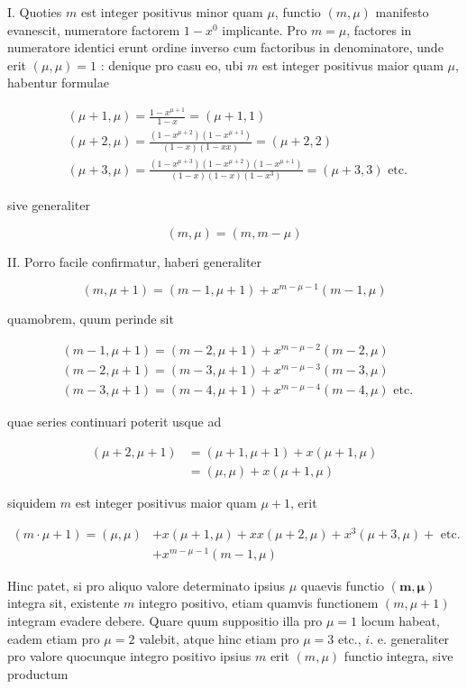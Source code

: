 \documentclass[10pt]{article}
\begin{document}
I. Quoties \(m\) est integer positivus minor quam \(\mu\), functio \((m, \mu)\) manifesto evanescit, numeratore factorem \(1-x^{0}\) implicante. Pro \(m=\mu\), factores in numeratore identici erunt ordine inverso cum factoribus in denominatore, unde erit \((\mu, \mu)=1\) : denique pro casu eo, ubi \(m\) est integer positivus maior quam \(\mu\), habentur formulae

\[
\begin{aligned}
& (\mu+1, \mu)=\frac{1-x^{\mu+1}}{1-x}=(\mu+1,1) \\
& (\mu+2, \mu)=\frac{\left(1-x^{\mu+2}\right)\left(1-x^{\mu+1}\right)}{(1-x)(1-x x)}=(\mu+2,2) \\
& (\mu+3, \mu)=\frac{\left(1-x^{\mu+3}\right)\left(1-x^{\mu+2}\right)\left(1-x^{\mu+1}\right)}{(1-x)(1-x)\left(1-x^{3}\right)}=(\mu+3,3) \text { etc. }
\end{aligned}
\]

sive generaliter

\[
(m, \mu)=(m, m-\mu)
\]

II. Porro facile confirmatur, haberi generaliter

\[
(m, \mu+1)=(m-1, \mu+1)+x^{m-\mu-1}(m-1, \mu)
\]

quamobrem, quum perinde sit

\[
\begin{aligned}
& (m-1, \mu+1)=(m-2, \mu+1)+x^{m-\mu-2}(m-2, \mu) \\
& (m-2, \mu+1)=(m-3, \mu+1)+x^{m-\mu-3}(m-3, \mu) \\
& (m-3, \mu+1)=(m-4, \mu+1)+x^{m-\mu-4}(m-4, \mu) \text { etc. }
\end{aligned}
\]

quae series continuari poterit usque ad

\[
\begin{aligned}
(\mu+2, \mu+1) & =(\mu+1, \mu+1)+x(\mu+1, \mu) \\
& =(\mu, \mu)+x(\mu+1, \mu)
\end{aligned}
\]

siquidem \(m\) est integer positivus maior quam \(\mu+1\), erit

\[
\begin{aligned}
(m \cdot \mu+1)=(\mu, \mu) & +x(\mu+1, \mu)+x x(\mu+2, \mu)+x^{3}(\mu+3, \mu)+\text { etc. } \\
& +x^{m-\mu-1}(m-1, \mu)
\end{aligned}
\]

Hinc patet, si pro aliquo valore determinato ipsius \(\mu\) quaevis functio \((\boldsymbol{m}, \boldsymbol{\mu})\) integra sit, existente \(m\) integro positivo, etiam quamvis functionem \((m, \mu+1)\) integram evadere debere. Quare quum suppositio illa pro \(\mu=1\) locum habeat, eadem etiam pro \(\mu=2\) valebit, atque hinc etiam pro \(\mu=3\) etc., \(i\). e. generaliter pro valore quocunque integro positivo ipsius \(m\) erit \((m, \mu)\) functio integra, sive productum
\end{document}
